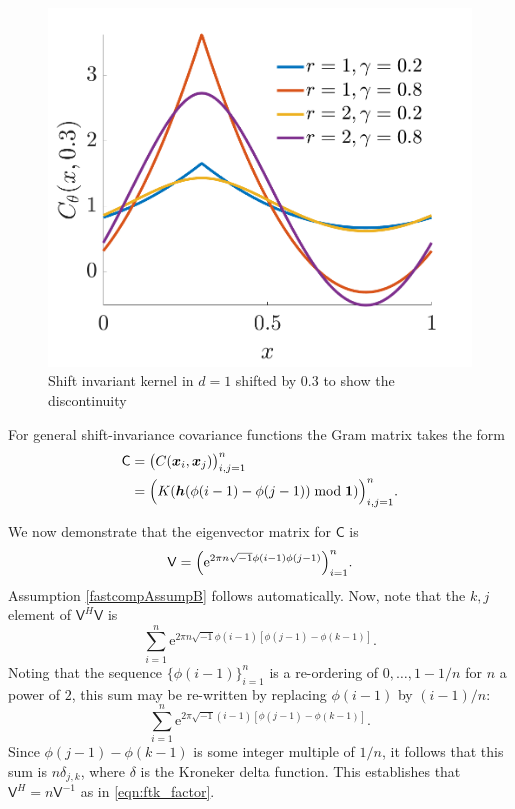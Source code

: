 \documentclass{iitthesis}          %
\newcommand{\bm}[1]{\boldsymbol{#1}}
\newcommand{\vh}{\bm{h}}
\newcommand{\vx}{\bm{x}}
\newcommand{\vone}{\bm{1}}
\newcommand{\mC}{\mathsf{C}}
\newcommand{\mV}{\mathsf{V}}
\newcommand{\me}{\mathrm{e}}
\begin{document}
\begin{figure}
	\centering
	\includegraphics[width=0.9\linewidth]{"figures/fourier_kernel_dim_1"}
	\caption[Fourier kernel]{Shift invariant kernel in $d=1$ shifted by 0.3 to show the discontinuity}
	\label{fig:fourierkernel-dim1}
\end{figure}



For general shift-invariance covariance functions the Gram matrix takes the form
\begin{align*}
\mC &= \bigl ( C(\vx_i, \vx_j) \bigr)_{i, j = 1}^n \\
& = \Bigl ( K(\vh(\phi(i-1) - \phi(j-1)) \bmod \vone ) \Bigr)_{i, j = 1}^n.
\end{align*}

We now demonstrate that the eigenvector matrix for $\mC$ is 
\begin{equation} \label{latticeVdef}
\mV = \Bigl ( \me^{2 \pi n \sqrt{-1} \phi(i-1)\phi(j-1)} \Bigr)_{i = 1}^n.
\end{equation}
Assumption \eqref{fastcompAssumpB} follows automatically.
Now, note that the $k,j$ element of $\mV^H\mV$ is
\begin{equation*}
\sum_{i=1}^n \me^{2 \pi n \sqrt{-1} \phi(i-1)[\phi(j-1) - \phi(k-1)]}.
\end{equation*}
Noting that the sequence $\{\phi(i-1)\}_{i=1}^n$ is a re-ordering of $0, \ldots, 1-1/n$ for $n$ a power of $2$, this sum may be re-written by replacing $\phi(i-1)$ by $(i-1)/n$:
\begin{equation*}
\sum_{i=1}^n \me^{2 \pi \sqrt{-1} (i-1)[\phi(j-1) - \phi(k-1)]}.
\end{equation*}
Since $\phi(j-1) - \phi(k-1)$ is some integer multiple of $1/n$, it follows that this sum is $n \delta_{j,k}$, where $\delta$ is the Kroneker delta function.  This establishes that $\mV^H = n \mV^{-1}$ as in \eqref{eqn:ftk_factor}.
\end{document}
